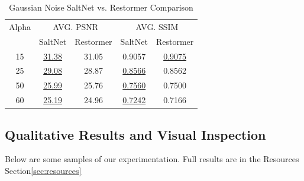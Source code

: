 \begin{table}[!hbt]
    \centering
    \begin{tabular}{ccccc}
        \hline
        Alpha & \multicolumn{2}{c}{AVG. PSNR} & \multicolumn{2}{c}{AVG. SSIM} \\
            & SaltNet & Restormer & SaltNet & Restormer \\
        \hline
        15    & \underline{31.38}   & 31.05     & 0.9057  & \underline{0.9075}  \\
        25    & \underline{29.08}   & 28.87     & \underline{0.8566}  & 0.8562  \\
        50    & \underline{25.99}   & 25.76     & \underline{0.7560}  & 0.7500  \\
        60    & \underline{25.19}   & 24.96     & \underline{0.7242}  & 0.7166  \\
        \hline
    \end{tabular}
    \caption{Gaussian Noise SaltNet vs. Restormer Comparison}
\end{table}

% 




\subsection{Qualitative Results and Visual Inspection}

Below are some samples of our experimentation. Full results are in the Resources Section\ref{sec:resources}

